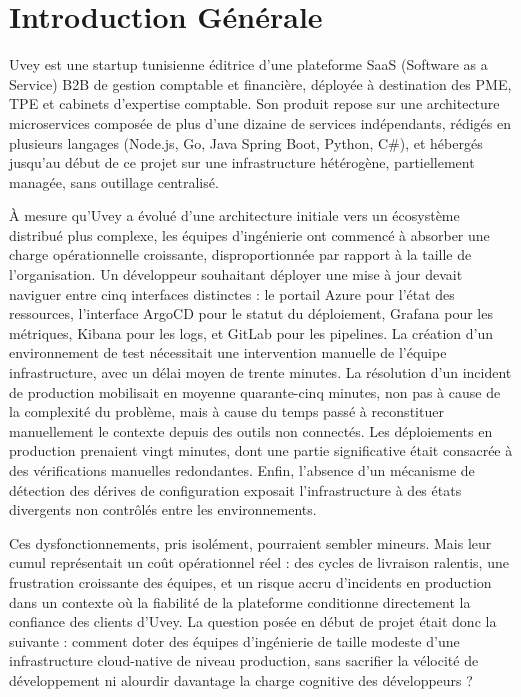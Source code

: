 \chapter*{Introduction Générale}

\noindent Uvey est une startup tunisienne éditrice d'une plateforme SaaS (Software as a Service) B2B de gestion comptable et financière, déployée à destination des PME, TPE et cabinets d'expertise comptable. Son produit repose sur une architecture microservices composée de plus d'une dizaine de services indépendants, rédigés en plusieurs langages (Node.js, Go, Java Spring Boot, Python, C\#), et hébergés jusqu'au début de ce projet sur une infrastructure hétérogène, partiellement managée, sans outillage centralisé.

\vspace{0.4cm}

\noindent À mesure qu'Uvey a évolué d'une architecture initiale vers un écosystème distribué plus complexe, les équipes d'ingénierie ont commencé à absorber une charge opérationnelle croissante, disproportionnée par rapport à la taille de l'organisation. Un développeur souhaitant déployer une mise à jour devait naviguer entre cinq interfaces distinctes : le portail Azure pour l'état des ressources, l'interface ArgoCD pour le statut du déploiement, Grafana pour les métriques, Kibana pour les logs, et GitLab pour les pipelines. La création d'un environnement de test nécessitait une intervention manuelle de l'équipe infrastructure, avec un délai moyen de trente minutes. La résolution d'un incident de production mobilisait en moyenne quarante-cinq minutes, non pas à cause de la complexité du problème, mais à cause du temps passé à reconstituer manuellement le contexte depuis des outils non connectés. Les déploiements en production prenaient vingt minutes, dont une partie significative était consacrée à des vérifications manuelles redondantes. Enfin, l'absence d'un mécanisme de détection des dérives de configuration exposait l'infrastructure à des états divergents non contrôlés entre les environnements.

\vspace{0.4cm}

\noindent Ces dysfonctionnements, pris isolément, pourraient sembler mineurs. Mais leur cumul représentait un coût opérationnel réel : des cycles de livraison ralentis, une frustration croissante des équipes, et un risque accru d'incidents en production dans un contexte où la fiabilité de la plateforme conditionne directement la confiance des clients d'Uvey. La question posée en début de projet était donc la suivante : comment doter des équipes d'ingénierie de taille modeste d'une infrastructure cloud-native de niveau production, sans sacrifier la vélocité de développement ni alourdir davantage la charge cognitive des développeurs ?

